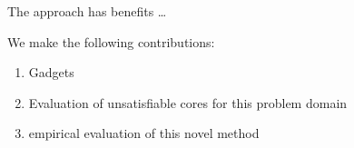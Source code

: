The approach has benefits \ldots{}

We make the following contributions:
\begin{enumerate}
\item Gadgets
\item Evaluation of unsatisfiable cores for this problem domain
\item empirical evaluation of this novel method
\end{enumerate}



